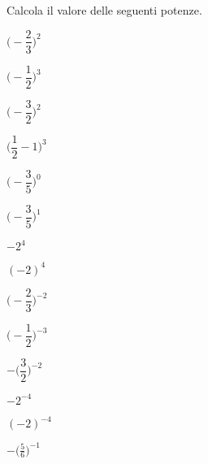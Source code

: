 \subsubsection*{}

\begin{esercizio}
 \label{ese:3.56}
Calcola il valore delle seguenti potenze.
\begin{multicols}{4}
\begin{enumeratea}
\spazielenx
 \item \(\bigg(-\dfrac{2}{3}\bigg)^2\)
 \item \(\bigg(-\dfrac{1}{2}\bigg)^3\)
 \item \(\bigg(-\dfrac{3}{2}\bigg)^2\)
 \item \(\bigg(\dfrac{1}{2}-1\bigg)^3\)
 \item \(\bigg(-\dfrac{3}{5}\bigg)^0\)
 \item \(\bigg(-\dfrac{3}{5}\bigg)^1\)
 \item \(-2^4\)
 \item \((-2)^4\)
 \item \(\bigg(-\dfrac{2}{3}\bigg)^{-2}\)
 \item \(\bigg(-\dfrac{1}{2}\bigg)^{-3}\)
 \item \(-\bigg(\dfrac{3}{2}\bigg)^{-2}\)
 \item \(-2^{-4}\)
 \item \((-2)^{-4}\)
 \item \(-\bigg(\frac{5}{6}\bigg)^{-1}\)
\end{enumeratea}
\end{multicols}
\end{esercizio}

